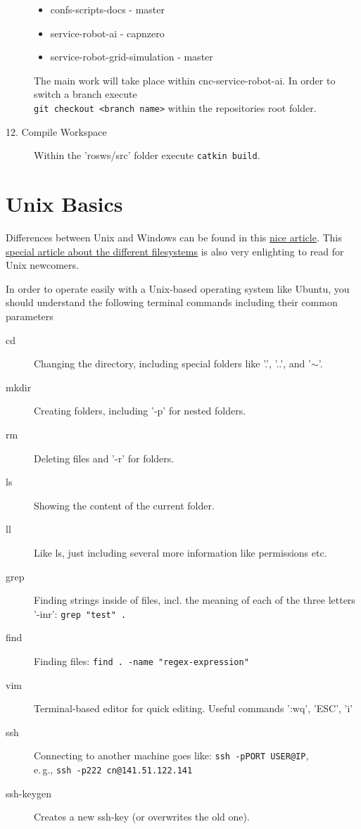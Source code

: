 \begin{description}
\begin{itemize}
		\item confs-scripts-docs - master
		\item service-robot-ai - capnzero
		\item service-robot-grid-simulation - master
	\end{itemize}
	The main work will take place within cnc-service-robot-ai. In order to switch a branch execute\\\verb#git checkout <branch name># within the repositories root folder.
	\item[12. Compile Workspace] Within the 'rosws/src' folder execute \verb#catkin build#.
\end{description}

\section{Unix Basics}
\label{sec:LinuxBasics}

Differences between Unix and Windows can be found in this \href{https://www.techrepublic.com/blog/10-things/10-fundamental-differences-between-linux-and-windows/}{nice article}. This \href{https://www.howtogeek.com/137096/6-ways-the-linux-file-system-is-different-from-the-windows-file-system/}{special article about the different filesystems} is also very enlighting to read for Unix newcomers.

In order to operate easily with a Unix-based operating system like Ubuntu, you should understand the following terminal commands including their common parameters 

\begin{description}
\item [cd] Changing the directory, including special folders like '.', '..', and '$\sim$'.
\item [mkdir] Creating folders, including '-p' for nested folders.
\item [rm] Deleting files and '-r' for folders.
\item [ls] Showing the content of the current folder.
\item [ll] Like ls, just including several more information like permissions etc.
\item [grep] Finding strings inside of files, incl. the meaning of each of the three letters '-inr': \verb#grep "test" .# 
\item [find] Finding files: \verb#find . -name "regex-expression"#
\item [vim] Terminal-based editor for quick editing. Useful commands ':wq', 'ESC', 'i'
\item [ssh] Connecting to another machine goes like: \verb#ssh -pPORT USER@IP#,\\e.\,g., \verb#ssh -p222 cn@141.51.122.141#
\item [ssh-keygen] Creates a new ssh-key (or overwrites the old one).
\end{description}

